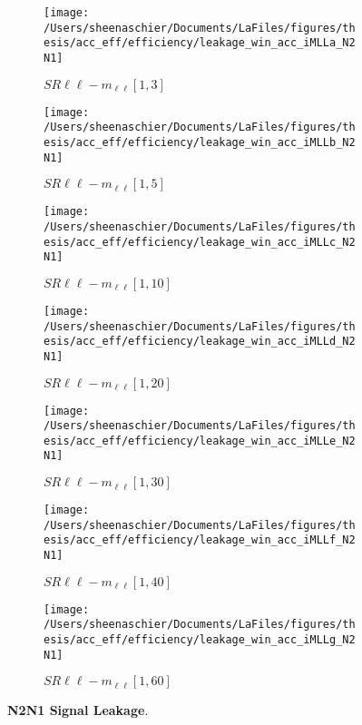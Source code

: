 \begin{figure}
        \centering
    \begin{subfigure}[b]{0.44\textwidth}
        \texttt{[image: /Users/sheenaschier/Documents/LaFiles/figures/thesis/acc\_eff/efficiency/leakage\_win\_acc\_iMLLa\_N2N1]}
    \caption{$SR\ell\ell-m_{\ell\ell} [1, 3]$}
    \end{subfigure}
    \begin{subfigure}[b]{0.44\textwidth}
        \texttt{[image: /Users/sheenaschier/Documents/LaFiles/figures/thesis/acc\_eff/efficiency/leakage\_win\_acc\_iMLLb\_N2N1]}
    \caption{$SR\ell\ell-m_{\ell\ell} [1, 5]$}
    \end{subfigure}
    \begin{subfigure}[b]{0.44\textwidth}
        \texttt{[image: /Users/sheenaschier/Documents/LaFiles/figures/thesis/acc\_eff/efficiency/leakage\_win\_acc\_iMLLc\_N2N1]}
    \caption{$SR\ell\ell-m_{\ell\ell} [1, 10]$}
    \end{subfigure}
    \begin{subfigure}[b]{0.44\textwidth}
        \texttt{[image: /Users/sheenaschier/Documents/LaFiles/figures/thesis/acc\_eff/efficiency/leakage\_win\_acc\_iMLLd\_N2N1]}
    \caption{$SR\ell\ell-m_{\ell\ell} [1, 20]$}
    \end{subfigure}
    \begin{subfigure}[b]{0.44\textwidth}
        \texttt{[image: /Users/sheenaschier/Documents/LaFiles/figures/thesis/acc\_eff/efficiency/leakage\_win\_acc\_iMLLe\_N2N1]}
    \caption{$SR\ell\ell-m_{\ell\ell} [1, 30]$}
    \end{subfigure}
    \begin{subfigure}[b]{0.44\textwidth}
        \texttt{[image: /Users/sheenaschier/Documents/LaFiles/figures/thesis/acc\_eff/efficiency/leakage\_win\_acc\_iMLLf\_N2N1]}
    \caption{$SR\ell\ell-m_{\ell\ell} [1, 40]$}
    \end{subfigure}
    \begin{subfigure}[b]{0.44\textwidth}
        \texttt{[image: /Users/sheenaschier/Documents/LaFiles/figures/thesis/acc\_eff/efficiency/leakage\_win\_acc\_iMLLg\_N2N1]}
    \caption{$SR\ell\ell-m_{\ell\ell} [1, 60]$}
    \end{subfigure}
    \caption{\textbf{N2N1 Signal Leakage}.}
\end{figure}

